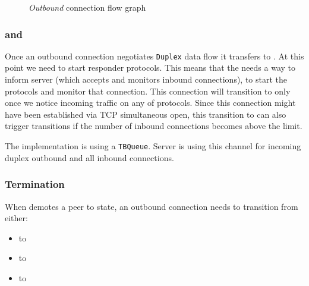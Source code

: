 \begin{figure}[p]
{}
  \caption{\textit{Outbound} connection flow graph}
  \label{fig:outbound_flow}
\end{figure}

\subsubsection{\OutboundStateDup{} and \DuplexState{}}
Once an outbound connection negotiates \texttt{Duplex} data flow it transfers
to \OutboundStateDup{}.  At this point we need to start responder protocols.
This means that the \connmngr{} needs a way to inform server (which
accepts and monitors inbound connections), to start the protocols and monitor
that connection.  This connection will transition to \DuplexState{} only once
we notice incoming traffic on any of \established{} protocols. Since this connection might
have been established via TCP simultaneous open, this transition to \DuplexState{} can
also trigger \Prune{} transitions if the number of inbound connections becomes above
the limit.

\begin{detail}
  The implementation is using a \texttt{TBQueue}. Server is using this channel
  for incoming duplex outbound and all inbound connections.
\end{detail}

\subsubsection{Termination}\label{sec:outbound_termination}

When \ptopgov{} demotes a peer to \cold{} state, an outbound
connection needs to transition from either:

\begin{itemize}
  \item \OutboundStateAny{} to \OutboundIdleStateAny{}
  \item \OutboundStateDupTau{} to \InboundIdleStateDup{}
  \item \DuplexState{} to \InboundStateDup{}
\end{itemize}

